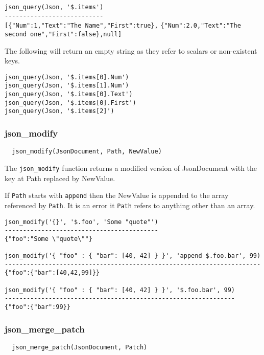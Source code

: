 \verb`json_query(Json, '$.items')`\\
\verb`---------------------------`\\
\verb`[{"Num":1,"Text":"The Name","First":true},`\split
\verb`{"Num":2.0,"Text":"The second one","First":false},null]`

The following will return an empty string as they refer to scalars
or non-existent keys.
\begin{verbatim}
json_query(Json, '$.items[0].Num')
json_query(Json, '$.items[1].Num')
json_query(Json, '$.items[0].Text')
json_query(Json, '$.items[0].First')
json_query(Json, '$.items[2]')
\end{verbatim}


\subsubsection{json\_modify}

\begin{verbatim}
  json_modify(JsonDocument, Path, NewValue)
\end{verbatim}

The \verb`json_modify` function returns a modified version of JsonDocument
with the key at Path replaced by NewValue.

If \verb`Path` starts with {\tt append\textvisiblespace } then the NewValue is appended to the
array referenced by {\tt Path}.  It is an error it {\tt Path} refers to anything
other than an array.

\begin{verbatim}
json_modify('{}', '$.foo', 'Some "quote"')
------------------------------------------
{"foo":"Some \"quote\""}

json_modify('{ "foo" : { "bar": [40, 42] } }', 'append $.foo.bar', 99)
----------------------------------------------------------------------
{"foo":{"bar":[40,42,99]}}

json_modify('{ "foo" : { "bar": [40, 42] } }', '$.foo.bar', 99)
---------------------------------------------------------------
{"foo":{"bar":99}}
\end{verbatim}
\subsubsection{json\_merge\_patch}

\begin{verbatim}
  json_merge_patch(JsonDocument, Patch)
\end{verbatim}

